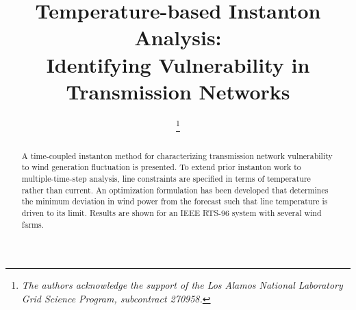 \documentclass[conference]{IEEEtran}
\begin{document}
%
\title{Temperature-based Instanton Analysis: \\
Identifying Vulnerability in Transmission Networks}


\author{%

\and
{}
\and
{}

%

\thanks{\emph{The authors acknowledge the support of the Los Alamos National Laboratory Grid Science Program, subcontract 270958.}}%
}

\maketitle

\begin{abstract}
A time-coupled instanton method for characterizing transmission
network vulnerability to wind generation fluctuation is presented. To
extend prior instanton work to multiple-time-step analysis, line
constraints are specified in terms of temperature rather than
current. An optimization formulation has been developed that
determines the minimum deviation in wind power from the forecast such
that line temperature is driven to its limit. Results are shown for an
IEEE RTS-96 system with several wind farms.
\end{abstract}
\end{document}

